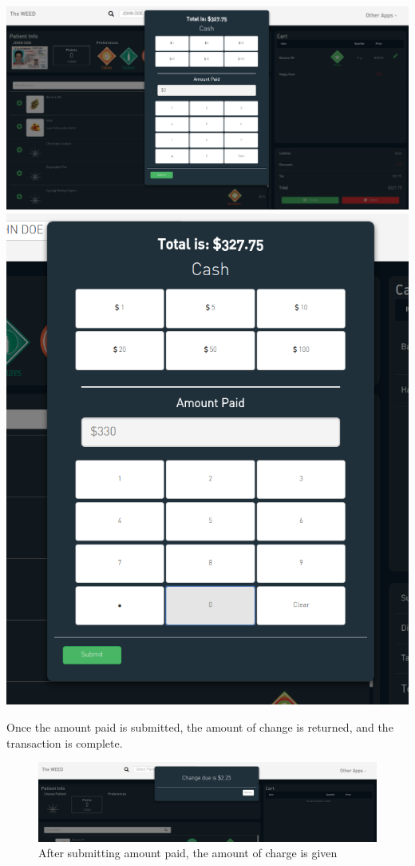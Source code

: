 \documentclass[]{book}
\theoremstyle{definition}
\theoremstyle{definition}
\theoremstyle{definition}
\theoremstyle{remark}
\begin{document}
\includegraphics{images/P9.png} \includegraphics{images/P10.png}

Once the amount paid is submitted, the amount of change is returned, and
the transaction is complete.

\begin{figure}
\centering
\includegraphics{images/P11.png}
\caption{After submitting amount paid, the amount of charge is given}
\end{figure}
\end{document}
